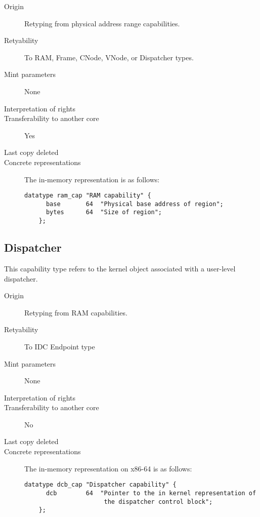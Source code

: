 \begin{description}
\item[Origin] Retyping from physical address range capabilities.
  
\item[Retyability] To RAM, Frame, CNode, VNode, or Dispatcher types.
  
\item[Mint parameters] None
  
\item[Interpretation of rights] 
  
\item[Transferability to another core] Yes

\item[Last copy deleted] 
  
\item[Concrete representations] The in-memory representation is as follows:
  
  \begin{lstlisting}[language=Mackerel]
    datatype ram_cap "RAM capability" {
      base       64  "Physical base address of region";
      bytes      64  "Size of region";
    };
  \end{lstlisting}
\end{description}

\subsection{Dispatcher}
This capability type refers to the kernel object associated with a
user-level dispatcher.

\begin{description}
\item[Origin] Retyping from RAM capabilities.
  
\item[Retyability] To IDC Endpoint type
  
\item[Mint parameters] None
  
\item[Interpretation of rights] 
  
\item[Transferability to another core] No

\item[Last copy deleted] 
  
\item[Concrete representations] The in-memory representation on x86-64
  is as follows:
  
  \begin{lstlisting}[language=Mackerel]
    datatype dcb_cap "Dispatcher capability" {
      dcb        64  "Pointer to the in kernel representation of
                      the dispatcher control block";
    };
  \end{lstlisting}
\end{description}

